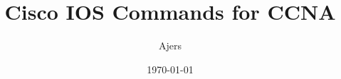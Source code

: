 



\title{Cisco IOS Commands for CCNA}
\date{\today}
\author{Ajers}

\maketitle

\tableofcontents
\pagebreak

















